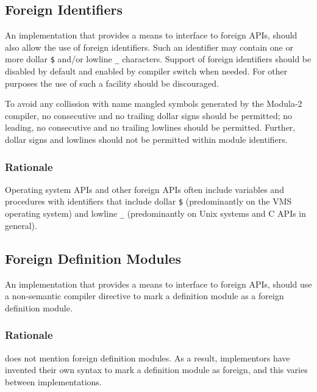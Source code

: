 \documentclass[10pt,a4paper]{article}
\begin{document}
\subsection{Foreign Identifiers}

An implementation that provides a means to interface to \glspl{foreign API},
should also allow the use of \glspl{foreign identifier}. Such an identifier may
contain one or more dollar \verb|$| and/or lowline \verb|_| characters. Support
of \glspl{foreign identifier} should be disabled by default and enabled by
compiler switch when needed. For other purposes the use of such a facility
should be discouraged.

To avoid any collission with name mangled symbols generated by the Modula-2
compiler, no consecutive and no trailing dollar signs should be permitted; no
leading, no consecutive and no trailing lowlines should be permitted. Further,
dollar signs and lowlines should not be permitted within module identifiers. 

\subsubsection{Rationale}

Operating system \Glspl{API} and other \glspl{foreign API} often include
variables and procedures with identifiers that include dollar \verb|$|
(predominantly on the VMS operating system) and lowline \verb|_|
(predominantly on Unix systems and C \glspl{API} in general).


\subsection{Foreign Definition Modules}

An implementation that provides a means to interface to \glspl{foreign API},
should use a \gls{non-semantic compiler directive} to mark a definition module
as a \gls{foreign definition module}.

\subsubsection{Rationale}

\cite{Wirth88} does not mention \glspl{foreign definition module}. As a result,
implementors have invented their own syntax to mark a definition module as
foreign, and this varies between implementations.
\end{document}
